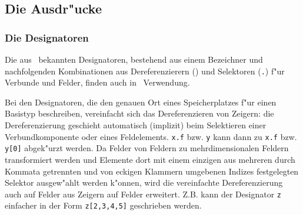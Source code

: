 \subsection{Die Ausdr"ucke}

\subsubsection{Die Designatoren}
\label{Designatoren}

Die aus \modula\ bekannten Designatoren, bestehend aus einem Bezeichner und
nachfolgenden Kombinationen aus Dereferenzierern (\caret) und Selektoren ({\tt.})
f"ur Verbunde und Felder, finden auch in \oberon\ Verwendung.

Bei den Designatoren, die den genauen Ort eines Speicherplatzes f"ur einen
Basistyp beschreiben, vereinfacht sich das Dereferenzieren von Zeigern: die
Dereferenzierung geschieht automatisch (implizit) beim Selektieren einer Verbundkomponente
oder eines Feldelements.
{\tt x\caret.f} bzw. {\tt y\caret[0]} kann dann zu {\tt x.f} bzw. {\tt y[0]} abgek"urzt
werden.
Da Felder von Feldern zu mehrdimensionalen Feldern transformiert werden und
Elemente dort mit einem einzigen aus mehreren durch Kommata
getrennten und von eckigen Klammern umgebenen Indizes festgelegten Selektor
ausgew"ahlt werden k"onnen, wird die vereinfachte Dereferenzierung auch auf
Felder aus Zeigern auf Felder erweitert.
Z.B. kann der Designator {\tt z\caret[2]\caret[3,4]\caret[5]} einfacher in der Form
{\tt z[2,3,4,5]} geschrieben werden.

